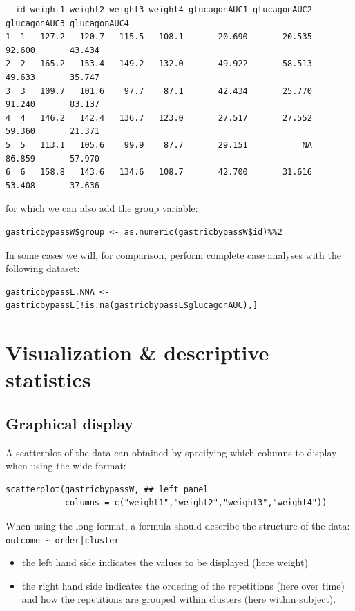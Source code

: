\documentclass[12pt]{article}
\begin{document}
\begin{verbatim}
  id weight1 weight2 weight3 weight4 glucagonAUC1 glucagonAUC2 glucagonAUC3 glucagonAUC4
1  1   127.2   120.7   115.5   108.1       20.690       20.535       92.600       43.434
2  2   165.2   153.4   149.2   132.0       49.922       58.513       49.633       35.747
3  3   109.7   101.6    97.7    87.1       42.434       25.770       91.240       83.137
4  4   146.2   142.4   136.7   123.0       27.517       27.552       59.360       21.371
5  5   113.1   105.6    99.9    87.7       29.151           NA       86.859       57.970
6  6   158.8   143.6   134.6   108.7       42.700       31.616       53.408       37.636
\end{verbatim}


for which we can also add the group variable:
\lstset{language=r,label= ,caption= ,captionpos=b,numbers=none}
\begin{lstlisting}
gastricbypassW$group <- as.numeric(gastricbypassW$id)%%2
\end{lstlisting}

In some cases we will, for comparison, perform complete case analyses
with the following dataset:
\lstset{language=r,label= ,caption= ,captionpos=b,numbers=none}
\begin{lstlisting}
gastricbypassL.NNA <- gastricbypassL[!is.na(gastricbypassL$glucagonAUC),]
\end{lstlisting}

\clearpage

\section{Visualization \& descriptive statistics}
\label{sec:org5fb8c7e}
\subsection{Graphical display}
\label{sec:orgbbc958a}

A scatterplot of the data can obtained by specifying which columns to
display when using the wide format:
\lstset{language=r,label= ,caption= ,captionpos=b,numbers=none}
\begin{lstlisting}
scatterplot(gastricbypassW, ## left panel
            columns = c("weight1","weight2","weight3","weight4")) 
\end{lstlisting}

\noindent When using the long format, a formula should describe the
structure of the data: \texttt{outcome \textasciitilde{} order|cluster}
\begin{itemize}
\item the left hand side indicates the values to be displayed (here weight)
\item the right hand side indicates the ordering of the repetitions (here over time) and
how the repetitions are grouped within clusters (here within subject).
\end{itemize}
\end{document}
